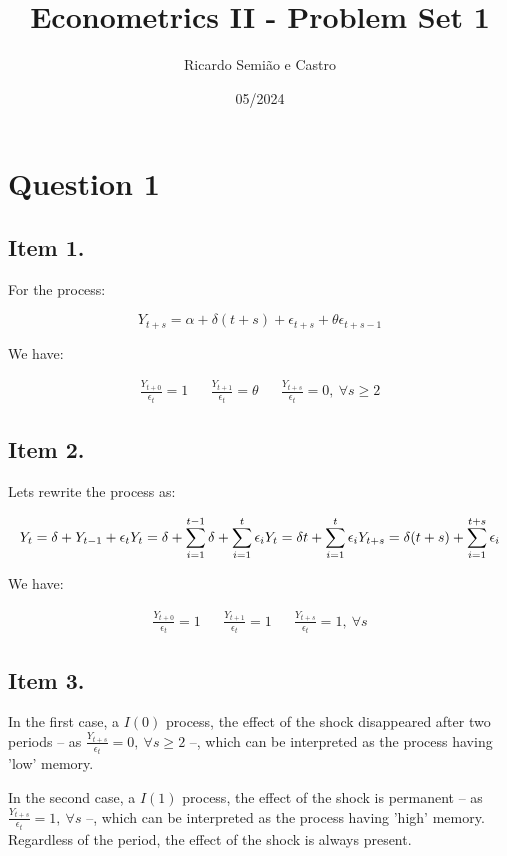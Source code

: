\documentclass[12pt]{article}
\title{Econometrics II - Problem Set 1}
\author{Ricardo Semião e Castro}
\date{05/2024}
\begin{document}
\maketitle


\section*{Question 1}

\subsection*{Item 1.}
For the process:

$$
Y_{t+s} = \alpha + \delta(t+s) + \epsilon_{t+s} + \theta \epsilon_{t+s-1}
$$

We have:

\begin{align*}
    &\frac{Y_{t+0}}{\epsilon_{t}} = 1&
    &\frac{Y_{t+1}}{\epsilon_{t}} = \theta&
    &\frac{Y_{t+s}}{\epsilon_{t}} = 0,~ \forall s \geq 2&
\end{align*}


\subsection*{Item 2.}

Lets rewrite the process as:

$$
Y_{t} = \delta + Y_{t-1} + \epsilon_{t}\\
Y_{t} = \delta + \sum_{i=1}^{t-1}\delta + \sum_{i=1}^{t}\epsilon_{i}\\
Y_{t} = \delta t + \sum_{i=1}^{t}\epsilon_{i}\\
Y_{t+s} = \delta (t+s) + \sum_{i=1}^{t+s}\epsilon_{i}
$$

We have:

\begin{align*}
    &\frac{Y_{t+0}}{\epsilon_{t}} = 1&
    &\frac{Y_{t+1}}{\epsilon_{t}} = 1&
    &\frac{Y_{t+s}}{\epsilon_{t}} = 1,~ \forall s&
\end{align*}


\subsection*{Item 3.}
In the first case, a $I(0)$ process, the effect of the shock disappeared after two periods -- as $\frac{Y_{t+s}}{\epsilon_{t}} = 0,~ \forall s \geq 2$ --, which can be interpreted as the process having 'low' memory.

In the second case, a $I(1)$ process, the effect of the shock is permanent -- as $\frac{Y_{t+s}}{\epsilon_{t}} = 1,~ \forall s$ --, which can be interpreted as the process having 'high' memory. Regardless of the period, the effect of the shock is always present.
\end{document}

